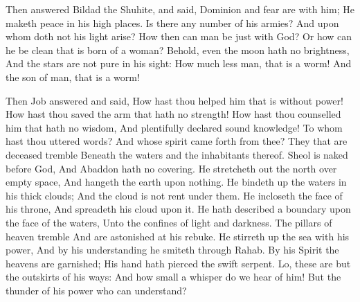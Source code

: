 Then answered Bildad the Shuhite, and said,  Dominion and fear are with him; He maketh peace in his high places.  Is there any number of his armies? And upon whom doth not his light arise?  How then can man be just with God? Or how can he be clean that is born of a woman?  Behold, even the moon hath no brightness, And the stars are not pure in his sight:  How much less man, that is a worm! And the son of man, that is a worm! 

Then Job answered and said,  How hast thou helped him that is without power! How hast thou saved the arm that hath no strength!  How hast thou counselled him that hath no wisdom, And plentifully declared sound knowledge!  To whom hast thou uttered words? And whose spirit came forth from thee?  They that are deceased tremble Beneath the waters and the inhabitants thereof.  Sheol is naked before God, And Abaddon hath no covering.  He stretcheth out the north over empty space, And hangeth the earth upon nothing.  He bindeth up the waters in his thick clouds; And the cloud is not rent under them.  He incloseth the face of his throne, And spreadeth his cloud upon it.  He hath described a boundary upon the face of the waters, Unto the confines of light and darkness.  The pillars of heaven tremble And are astonished at his rebuke.  He stirreth up the sea with his power, And by his understanding he smiteth through Rahab.  By his Spirit the heavens are garnished; His hand hath pierced the swift serpent.  Lo, these are but the outskirts of his ways: And how small a whisper do we hear of him! But the thunder of his power who can understand? 

